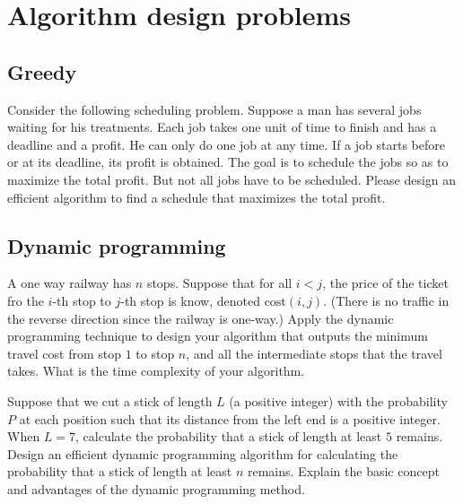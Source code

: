 \chapter{Algorithm design problems}

\section{Greedy}
\begin{Exercise}
Consider the following scheduling problem. Suppose a man has several jobs waiting for his treatments. Each job takes one unit of time to finish and has a deadline and a profit. He can only do one job at any time. If a job starts before or at its deadline, its profit is obtained. The goal is to schedule the jobs so as to maximize the total profit. But not all jobs have to be scheduled. Please design an efficient algorithm to find a schedule that maximizes the total profit. 
\end{Exercise}
\begin{Answer}
\end{Answer}


\section{Dynamic programming}
\begin{Exercise}
A one way railway has $n$ stops. Suppose that for all $i < j$, the price of the ticket fro the $i$-th stop to $j$-th stop is know, denoted $\text{cost}(i, j)$. (There is no traffic in the reverse direction since the railway is one-way.) Apply the dynamic programming technique to design your algorithm that outputs the minimum travel cost from stop $1$ to stop $n$, and all the intermediate stops that the travel takes. What is the time complexity of your algorithm. 
\end{Exercise}
\begin{Answer}
\end{Answer}

\begin{Exercise}
Suppose that we cut a stick of length $L$ (a positive integer) with the probability $P$ at each position such that its distance from the left end is a positive integer.
When $L = 7$, calculate the probability that a stick of length at least $5$ remains.
Design an efficient dynamic programming algorithm for calculating the probability that a stick of length at least $n$ remains.
Explain the basic concept and advantages of the dynamic programming method. 
\end{Exercise}
\begin{Answer}
\end{Answer}

